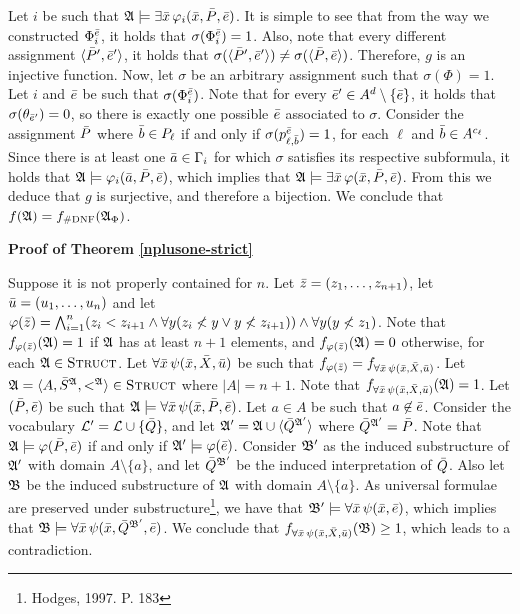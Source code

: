 \begin{enumerate}
	Let $i$ be such that $\A\models \exists\x\,\varphi_i(\x,\P,\e)$. It is simple to see that from the way we constructed $\Phi_i^{\e}$, it holds that $\sigma(\Phi_i^{\e}) = 1$. Also, note that every different assignment $\langle \P',\e' \rangle$, it holds that $\sigma(\langle \P',\e' \rangle) \neq \sigma(\langle \P,\e \rangle)$. Therefore, $g$ is an injective function. Now, let $\sigma$ be an arbitrary assignment such that $\sigma(\Phi) = 1$. Let $i$ and $\e$ be such that $\sigma(\Phi^{\e}_i)$. Note that for every $\e'\in A^d\setminus\{\e\}$, it holds that $\sigma(\theta_{\e'}) = 0$, so there is exactly one possible $\e$ associated to $\sigma$. Consider the assignment $\P$ where $\b\in P_{\ell}$ if and only if $\sigma(p^{\e}_{\ell,\b}) = 1$, for each $\ell$ and $\b \in A^{c_{\ell}}$. Since there is at least one $\a\in\Gamma_i$ for which $\sigma$ satisfies its respective subformula, it holds that $\A\models\varphi_i(\a,\P,\e)$, which implies that $\A\models\exists\x\,\varphi(\x,\P,\e)$. From this we deduce that $g$ is surjective, and therefore a bijection. We conclude that $f(\A) = f_{\textsc{\#DNF}}(\A_{\Phi})$.
\end{enumerate}
	
\textbf{Proof of Theorem \ref{nplusone-strict}}

Suppose it is not properly contained for $n$. Let $\z = (z_1,\ldots,z_{n+1})$, let $\u = (u_1,\ldots,u_n)$ and let $\varphi(\z) = \bigwedge_{i = 1}^{n} (z_i < z_{i+1} \wedge \forall y(z_i\not<y \vee y\not<z_{i+1} )) \wedge \forall y(y \not< z_1)$. Note that $f_{\varphi(\z)}(\A) = 1$ if $\A$ has at least $n+1$ elements, and  $f_{\varphi(\z)}(\A) = 0$ otherwise, for each $\A\in\str$. Let $\forall\x\,\psi(\x,\X,\u)$ be such that $f_{\varphi(\z)} = f_{\forall\x\,\psi(\x,\X,\u)}$. Let $\A = \langle A, \S^{\A}, <^{\A} \rangle\in\str$ where $\vert A \vert = n+1$. Note that $f_{\forall\x\,\psi(\x,\X,\u)}(\A) = 1$. Let $(\P,\e)$ be such that $\A\models\forall\x\,\psi(\x,\P,\e)$. Let $a\in A$ be such that $a\not\in\e$. Consider the vocabulary $\L' = \L \cup \{\Q\}$, and let $\A' = \A \cup \langle \Q^{\A'} \rangle$ where $\Q^{\A'} = \P$. Note that $\A\models\varphi(\P,\e)$ if and only if $\A'\models\varphi(\e)$. Consider $\B'$ as the induced substructure of $\A'$ with domain $A\setminus\{a\}$, and let $\Q^{\B'}$ be the induced interpretation of $\Q$. Also let $\B$ be the induced substructure of $\A$ with domain $A\setminus\{a\}$. As universal formulae are preserved under substructure\footnote{Hodges, 1997. P. 183}, we have that $\B'\models\forall\x\,\psi(\x,\e)$, which implies that $\B\models\forall\x\,\psi(\x,\Q^{\B'},\e)$. We conclude that $f_{\forall\x\,\psi(\x,\X,\u)}(\B) \geq 1$, which leads to a contradiction.
	
